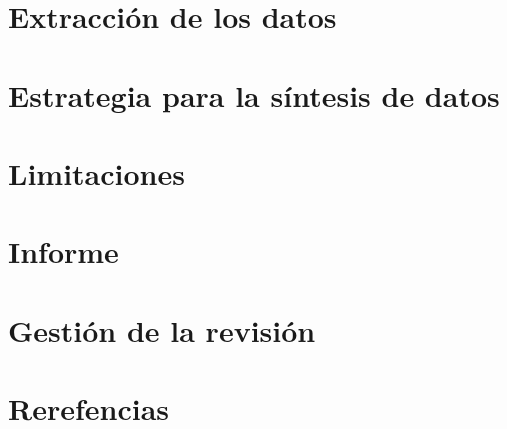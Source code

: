 \documentclass{article}
\begin{document}
\section{Extracción de los datos}
\section{Estrategia para la síntesis de datos}
\section{Limitaciones}
\section{Informe}
\section{Gestión de la revisión}
\section{Rerefencias}
\end{document}
